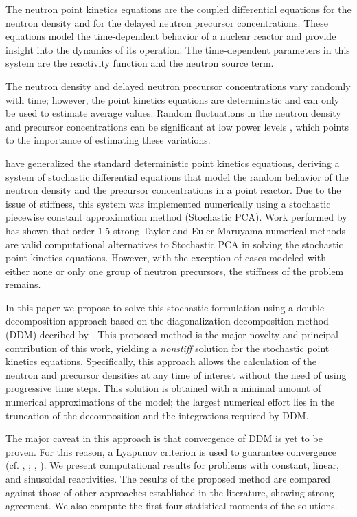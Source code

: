 \documentclass[preprint,12pt,authoryear]{elsarticle}
\begin{document}
The neutron point kinetics equations \citep{hetrick_71, kinard_04, hayes_05} are the coupled differential equations for the neutron density and for the delayed neutron precursor concentrations. 
These equations model the time-dependent behavior of a nuclear reactor and  provide insight into the dynamics of its operation.
The time-dependent parameters in this system are the reactivity function and the neutron source term.

The neutron density and delayed neutron precursor concentrations vary randomly with time; however, the point kinetics equations are deterministic and can only be used to estimate average values.
Random fluctuations in the neutron density and precursor concentrations can be significant at low power levels \citep{hurwitz_63a,hurwitz_63b}, which points to the importance of estimating these variations.

\citet{hayes_05} have generalized the standard deterministic point kinetics equations, deriving a system of stochastic differential equations that model the random behavior of the neutron density and the precursor concentrations in a point reactor.
Due to the issue of stiffness, this system was implemented numerically using a stochastic piecewise constant approximation method (Stochastic PCA).
Work performed by \citet{saha_12} has shown that order 1.5 strong Taylor and Euler-Maruyama numerical methods are valid computational alternatives to Stochastic PCA in solving the stochastic point kinetics equations.
However, with the exception of cases modeled with either none or only one group of neutron precursors, the stiffness of the problem remains.

In this paper we propose to solve this stochastic formulation using a double decomposition approach based on the diagonalization-decomposition method (DDM) decribed by \citet{wollmann_14}.
This proposed method is the major novelty and principal contribution of this work, yielding a {\em nonstiff} solution for the stochastic point kinetics equations.
Specifically, this approach allows the calculation of the neutron and precursor densities at any time of interest without the need of using progressive time steps.
This solution is obtained with a minimal amount of numerical approximations of the model; the largest numerical effort lies in the truncation of the decomposition and  the integrations required by DDM.

The major caveat in this approach is that convergence of DDM is yet to be proven.
For this reason, a Lyapunov criterion \citep{boichenko_05} is used to guarantee convergence (cf. \citeauthor{petersen_11a}, \citeyear{petersen_11a}; \citeauthor{wollmann_14}, \citeyear{wollmann_14}).
We present computational results for problems with constant, linear, and sinusoidal reactivities. 
The results of the proposed method are compared against those of other approaches established in the literature, showing strong agreement.
We also compute the first four statistical moments of the solutions.
\end{document}

